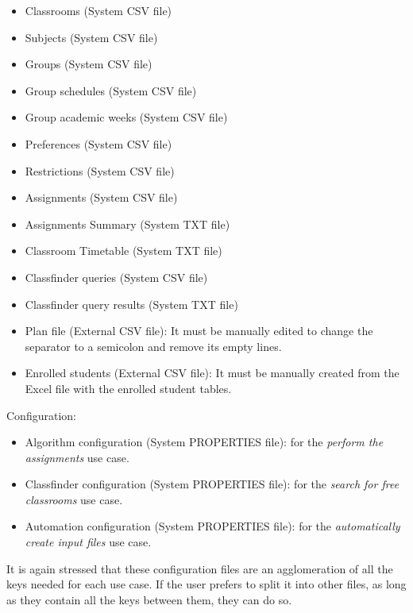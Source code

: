 \begin{itemize}
    \item Classrooms (System CSV file)
    \item Subjects (System CSV file)
    \item Groups (System CSV file)
    \item Group schedules (System CSV file)
    \item Group academic weeks (System CSV file)
    \item Preferences (System CSV file)
    \item Restrictions (System CSV file)
    \item Assignments (System CSV file)
    \item Assignments Summary (System TXT file)
    \item Classroom Timetable (System TXT file)
    \item Classfinder queries (System CSV file)
    \item Classfinder query results (System TXT file)
    \item Plan file (External CSV file): It must be manually edited to change the separator to a semicolon and remove its empty lines.
    \item Enrolled students (External CSV file): It must be manually created from the Excel file with the enrolled student tables.
\end{itemize}

Configuration:

\begin{itemize}
    \item Algorithm configuration (System PROPERTIES file): for the \textit{perform the assignments} use case.
    \item Classfinder configuration (System PROPERTIES file): for the \textit{search for free classrooms} use case.
    \item Automation configuration (System PROPERTIES file): for the \textit{automatically create input files} use case.
\end{itemize}

It is again stressed that these configuration files are an agglomeration of all the keys needed for each use case. If the user prefers to split it into other files, as long as they contain all the keys between them, they can do so.

